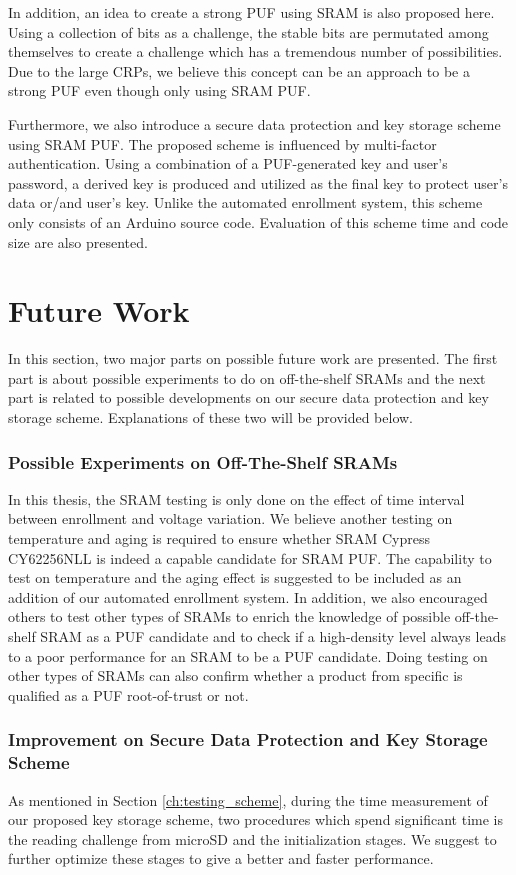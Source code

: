In addition, an idea to create a strong PUF using SRAM is also proposed here. Using a collection of bits as a challenge, the stable bits are permutated among themselves to create a challenge which has a tremendous number of possibilities.
Due to the large CRPs, we believe this concept can be an approach to be a strong PUF even though only using SRAM PUF.

Furthermore, we also introduce a secure data protection and key storage scheme using SRAM PUF. The proposed scheme is influenced by multi-factor authentication. Using a combination of a PUF-generated key and user's password, a derived key is produced and utilized as the final key to protect user's data or/and user's key. Unlike the automated enrollment system, this scheme only consists of an Arduino source code. Evaluation of this scheme time and code size are also presented.


\section{Future Work}

In this section, two major parts on possible future work are presented. The first part is about possible experiments to do on off-the-shelf SRAMs and the next part is related to possible developments on our secure data protection and key storage scheme. Explanations of these two will be provided below.

\subsubsection{Possible Experiments on Off-The-Shelf SRAMs}
In this thesis, the SRAM testing is only done on the effect of time interval between enrollment and voltage variation. We believe another testing on temperature and aging is required to ensure whether SRAM Cypress CY62256NLL is indeed a capable candidate for SRAM PUF. The capability to test on temperature and the aging effect is suggested to be included as an addition of our automated enrollment system.
In addition, we also encouraged others to test other types of SRAMs to enrich the knowledge of possible off-the-shelf SRAM as a PUF candidate and to check if a high-density level always leads to a poor performance for an SRAM to be a PUF candidate. Doing testing on other types of SRAMs can also confirm whether a product from specific is qualified as a PUF root-of-trust or not.


\subsubsection{Improvement on Secure Data Protection and Key Storage Scheme}
As mentioned in Section \ref{ch:testing_scheme}, during the time measurement of our proposed key storage scheme, two procedures which spend significant time is the reading challenge from microSD and the initialization stages. We suggest to further optimize these stages to give a better and faster performance.

